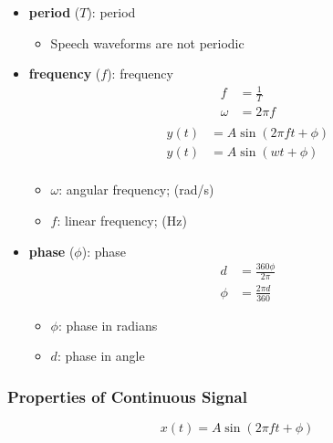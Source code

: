     \begin{itemize}
      \item \textbf{\Gls{period}} ($ T $): \glsdesc{period}
      \begin{itemize}
        \item Speech waveforms are not periodic
      \end{itemize}

      \item \textbf{\Gls{frequency}} ($ f $): \glsdesc{frequency}
      \begin{align}
        f &= \frac{1}{T} \\
        \omega &= 2 \pi f \\
      \end{align}
      \begin{align*}
        y\left( t \right) &= A \sin\left( 2\pi f t + \phi \right) \\
        y\left( t \right) &= A \sin\left( w t + \phi \right) \\
      \end{align*}
      \begin{itemize}
        \item $ \omega $: angular frequency; (rad/s)
        \item $ f $: linear frequency; (Hz)
      \end{itemize}

      \item \textbf{\Gls{phase}} ($ \phi $): \glsdesc{phase}
      \begin{align}
        d &= \frac{360 \phi}{2 \pi} \\
        \phi &= \frac{2 \pi d}{360}
      \end{align}
      \begin{itemize}
        \item $ \phi $: phase in radians
        \item $ d $: phase in angle
      \end{itemize}
    \end{itemize}

    \subsubsection{Properties of Continuous Signal}

      \begin{equation*}
        x\left( t \right) = A \sin\left( 2\pi f t + \phi \right)
      \end{equation*}

